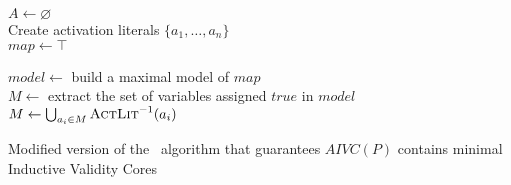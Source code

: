 \begin{algorithm}[t]
  \BlankLine
  $A \leftarrow \varnothing$\\
  Create activation literals $\{a_1, \ldots, a_n\}$ \\
  $map \leftarrow \top$ \\
  \BlankLine

   {
    $model \leftarrow $ build a maximal model of $map$ \\
    $M \leftarrow$ extract the set of variables assigned $true$ in $model$ \\
    $M \leftarrow \bigcup_{a_i \in M} \textsc{ActLit} ^{-1}(a_i)$ \\
\BlankLine
  }
\caption{Modified version of the \aivcalg ~algorithm that 
guarantees $AIVC(P)$ contains minimal Inductive Validity Cores}
\label{alg:aivc2}
\end{algorithm}